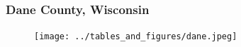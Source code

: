 \documentclass{beamer}
\begin{document}
\begin{frame}
  \frametitle{Dane County, Wisconsin} 


\begin{figure}[ht]
\centering
   \begin{minipage}{0.6\linewidth}
 \hspace{-0.5cm}      \texttt{[image: ../tables\_and\_figures/dane.jpeg]}
       \end{minipage}
\end{figure} 

\end{frame} 
\end{document}
